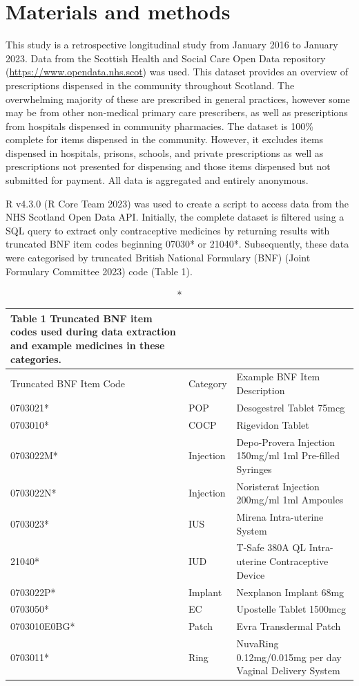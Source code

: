 \documentclass[
]{article}
\begin{document}
\hypertarget{materials-and-methods}{%
\section{Materials and methods}\label{materials-and-methods}}

This study is a retrospective longitudinal study from January 2016 to
January 2023. Data from the Scottish Health and Social Care Open Data
repository (\url{https://www.opendata.nhs.scot}) was used. This dataset
provides an overview of prescriptions dispensed in the community
throughout Scotland. The overwhelming majority of these are prescribed
in general practices, however some may be from other non-medical primary
care prescribers, as well as prescriptions from hospitals dispensed in
community pharmacies. The dataset is 100\% complete for items dispensed
in the community. However, it excludes items dispensed in hospitals,
prisons, schools, and private prescriptions as well as prescriptions not
presented for dispensing and those items dispensed but not submitted for
payment. All data is aggregated and entirely anonymous.

R v4.3.0 (R Core Team 2023) was used to create a script to access data
from the NHS Scotland Open Data API. Initially, the complete dataset is
filtered using a SQL query to extract only contraceptive medicines by
returning results with truncated BNF item codes beginning 07030* or
21040*. Subsequently, these data were categorised by truncated British
National Formulary (BNF) (Joint Formulary Committee 2023) code (Table
1).

\begin{longtable}{lll}
\caption*{
{\large \textbf{Table 1} Truncated BNF item codes used during data extraction and example medicines in these categories.}
} \\ 
\toprule
Truncated BNF Item Code & Category & Example BNF Item Description \\ 
\midrule
0703021* & POP & Desogestrel  Tablet 75mcg \\ 
0703010* & COCP & Rigevidon  Tablet \\ 
0703022M* & Injection & Depo-Provera Injection 150mg/ml 1ml Pre-filled Syringes \\ 
0703022N* & Injection & Noristerat Injection 200mg/ml 1ml Ampoules \\ 
0703023* & IUS & Mirena Intra-uterine System \\ 
21040* & IUD & T-Safe 380A QL Intra-uterine Contraceptive Device \\ 
0703022P* & Implant & Nexplanon Implant 68mg \\ 
0703050* & EC & Upostelle  Tablet 1500mcg \\ 
0703010E0BG* & Patch & Evra Transdermal Patch \\ 
0703011* & Ring & NuvaRing 0.12mg/0.015mg per day Vaginal Delivery System \\ 
\bottomrule
\end{longtable}
\end{document}
